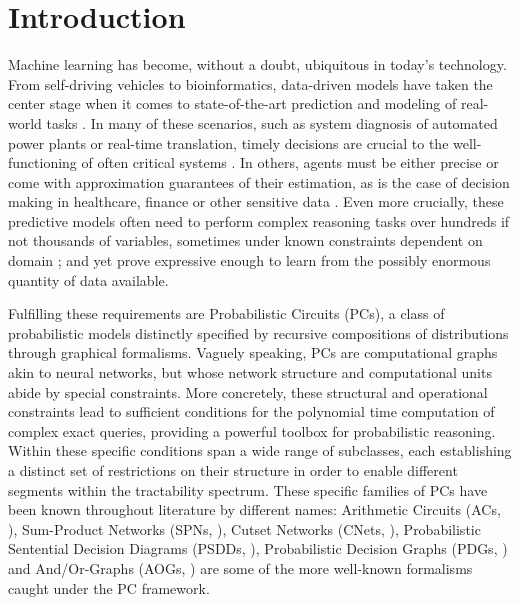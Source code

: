 \chapter{Introduction}

Machine learning has become, without a doubt, ubiquitous in today's technology. From self-driving
vehicles to bioinformatics, data-driven models have taken the center stage when it comes to
state-of-the-art prediction and modeling of real-world tasks \citep{grigorescu20,lan18,li19,khan18,
sezer20}. In many of these scenarios, such as system diagnosis of automated power plants or
real-time translation, timely decisions are crucial to the well-functioning of often critical
systems \citep{enshaei19,niehues18}. In others, agents must be either precise or come with
approximation guarantees of their estimation, as is the case of decision making in healthcare,
finance or other sensitive data \citep{lou19}. Even more crucially, these predictive models often
need to perform complex reasoning tasks over hundreds if not thousands of variables, sometimes
under known constraints dependent on domain \citep{xu18,marin20,wong12,lu13}; and yet prove
expressive enough to learn from the possibly enormous quantity of data available.

Fulfilling these requirements are Probabilistic Circuits (PCs), a class of probabilistic models
distinctly specified by recursive compositions of distributions through graphical formalisms.
Vaguely speaking, PCs are computational graphs akin to neural networks, but whose network structure
and computational units abide by special constraints. More concretely, these structural and
operational constraints lead to sufficient conditions for the polynomial time computation of
complex exact queries, providing a powerful toolbox for probabilistic reasoning. Within these
specific conditions span a wide range of subclasses, each establishing a distinct set of
restrictions on their structure in order to enable different segments within the tractability
spectrum. These specific families of PCs have been known throughout literature by different names:
Arithmetic Circuits (ACs, \cite{darwiche03}), Sum-Product Networks (SPNs, \cite{poon11}), Cutset
Networks (CNets, \cite{rahman14}), Probabilistic Sentential Decision Diagrams (PSDDs,
\cite{kisa14}), Probabilistic Decision Graphs (PDGs, \cite{jaeger04}) and And/Or-Graphs (AOGs,
\cite{dechter07}) are some of the more well-known formalisms caught under the PC framework.

